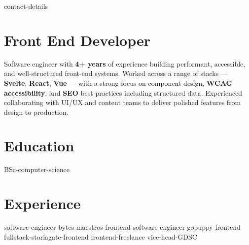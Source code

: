 \documentclass[a4paper,11pt]{article}
\newcommand{\resumeHeadingListStart}{
  \begin{itemize}[leftmargin=0.15in, label={}]
}
\newcommand{\resumeHeadingListEnd}{\end{itemize}}
\begin{document}

{contact-details}


\section{Front End Developer}
\small{
  Software engineer with \textbf{4+ years} of experience building performant, accessible, and well-structured front-end systems. Worked across a range of stacks — \textbf{Svelte}, \textbf{React}, \textbf{Vue} — with a strong focus on component design, \textbf{WCAG accessibility}, and \textbf{SEO} best practices including structured data. Experienced collaborating with UI/UX and content teams to deliver polished features from design to production.
}


\section{Education}
  \resumeHeadingListStart{}
    {BSc-computer-science}
  \resumeHeadingListEnd{}


\section{Experience}
\resumeHeadingListStart{}
  {software-engineer-bytes-maestros-frontend}
  {software-engineer-gopuppy-frontend}
  {fullstack-storiagate-frontend}
  {frontend-freelance}
  {vice-head-GDSC}
\resumeHeadingListEnd{}
\end{document}
